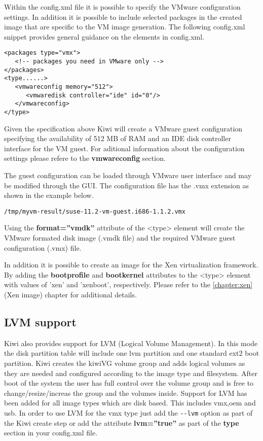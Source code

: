 Within the config.xml file it is possible to specify the VMware configuration
settings. In addition it is possible to include selected packages in the 
created image that are specific to the VM image generation. The following
config.xml snippet provides general guidance on the elements in config.xml.

\begin{Command}{13cm}
\begin{verbatim}
<packages type="vmx">
   <!-- packages you need in VMware only -->
</packages>
<type......>
   <vmwareconfig memory="512">
      <vmwaredisk controller="ide" id="0"/>
   </vmwareconfig>
</type>
\end{verbatim}
\end{Command}

Given the specification above Kiwi will create a VMware guest
configuration specifying the availability of 512 MB of RAM and an IDE 
disk controller interface for the VM guest. For aditional information
about the configuration settings please refere to the 
\textbf{vmwareconfig} section. 

The guest configuration can be loaded through VMware user interface and 
may be modified through the GUI. The configuration file has the .vmx 
extension as shown in the example below.

\begin{Command}{13cm}
\begin{verbatim}
/tmp/myvm-result/suse-11.2-vm-guest.i686-1.1.2.vmx
\end{verbatim}
\end{Command}

Using the \textbf{format=''vmdk''} attribute of the <type> element
will create the VMware formated disk image (.vmdk file) and the required 
VMware guest configuration (.vmx) file.

In addition it is possible to create an image for the Xen virtualization 
framework.  By adding the \textbf{bootprofile} and \textbf{bootkernel} 
attributes to the <type> element with values of 'xen' and 'xenboot', 
respectively. Please refer to the \ref{chapter:xen} (Xen image) chapter 
for additional details.

\subsection{LVM support}

Kiwi also provides support for LVM (Logical Volume Management). In this
mode the disk partition table will include one lvm partition and one
standard ext2 boot partition. Kiwi creates the kiwiVG volume group and
adds logical volumes as they are needed and configured according to the
image type and filesystem. After boot of the system the user has full
control over the volume group and is free to change/resize/increas the
group and the volumes inside. Support for LVM has been added for all
image types which are disk based. This includes vmx,oem and usb.
In order to use LVM for the vmx type just add the \verb+--lvm+ option
as part of the Kiwi create step or add the attribute \textbf{lvm=''true''}
as part of the \textbf{type} section in your config.xml file.

